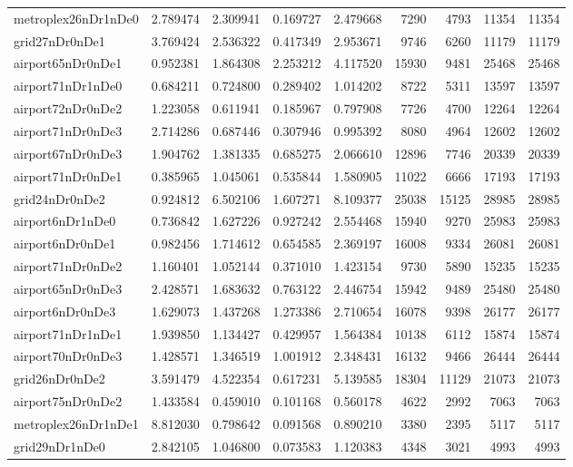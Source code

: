 \begin{longtable}{|l|r|r|r|r|r|r|r|r|}
metroplex26nDr1nDe0 & 2.789474 & 2.309941 & 0.169727 & 2.479668 & 7290 & 4793 & 11354 & 11354 \\
grid27nDr0nDe1 & 3.769424 & 2.536322 & 0.417349 & 2.953671 & 9746 & 6260 & 11179 & 11179 \\
airport65nDr0nDe1 & 0.952381 & 1.864308 & 2.253212 & 4.117520 & 15930 & 9481 & 25468 & 25468 \\
airport71nDr1nDe0 & 0.684211 & 0.724800 & 0.289402 & 1.014202 & 8722 & 5311 & 13597 & 13597 \\
airport72nDr0nDe2 & 1.223058 & 0.611941 & 0.185967 & 0.797908 & 7726 & 4700 & 12264 & 12264 \\
airport71nDr0nDe3 & 2.714286 & 0.687446 & 0.307946 & 0.995392 & 8080 & 4964 & 12602 & 12602 \\
airport67nDr0nDe3 & 1.904762 & 1.381335 & 0.685275 & 2.066610 & 12896 & 7746 & 20339 & 20339 \\
airport71nDr0nDe1 & 0.385965 & 1.045061 & 0.535844 & 1.580905 & 11022 & 6666 & 17193 & 17193 \\
grid24nDr0nDe2 & 0.924812 & 6.502106 & 1.607271 & 8.109377 & 25038 & 15125 & 28985 & 28985 \\
airport6nDr1nDe0 & 0.736842 & 1.627226 & 0.927242 & 2.554468 & 15940 & 9270 & 25983 & 25983 \\
airport6nDr0nDe1 & 0.982456 & 1.714612 & 0.654585 & 2.369197 & 16008 & 9334 & 26081 & 26081 \\
airport71nDr0nDe2 & 1.160401 & 1.052144 & 0.371010 & 1.423154 & 9730 & 5890 & 15235 & 15235 \\
airport65nDr0nDe3 & 2.428571 & 1.683632 & 0.763122 & 2.446754 & 15942 & 9489 & 25480 & 25480 \\
airport6nDr0nDe3 & 1.629073 & 1.437268 & 1.273386 & 2.710654 & 16078 & 9398 & 26177 & 26177 \\
airport71nDr1nDe1 & 1.939850 & 1.134427 & 0.429957 & 1.564384 & 10138 & 6112 & 15874 & 15874 \\
airport70nDr0nDe3 & 1.428571 & 1.346519 & 1.001912 & 2.348431 & 16132 & 9466 & 26444 & 26444 \\
grid26nDr0nDe2 & 3.591479 & 4.522354 & 0.617231 & 5.139585 & 18304 & 11129 & 21073 & 21073 \\
airport75nDr0nDe2 & 1.433584 & 0.459010 & 0.101168 & 0.560178 & 4622 & 2992 & 7063 & 7063 \\
metroplex26nDr1nDe1 & 8.812030 & 0.798642 & 0.091568 & 0.890210 & 3380 & 2395 & 5117 & 5117 \\
grid29nDr1nDe0 & 2.842105 & 1.046800 & 0.073583 & 1.120383 & 4348 & 3021 & 4993 & 4993 \\

\end{longtable}
